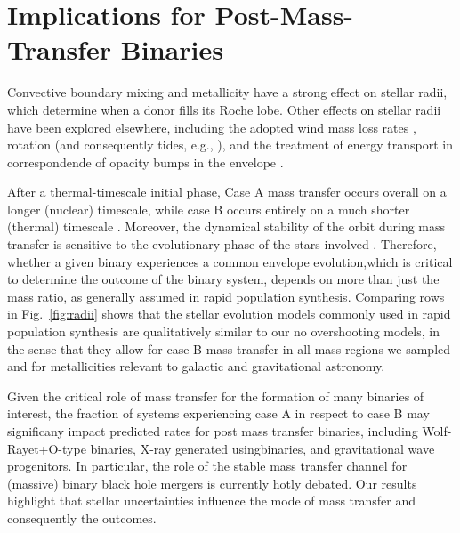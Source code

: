 \documentclass[twocolumn]{aastex63}
\DeclareRobustCommand{\Figref}[1]{Fig.~\ref{#1}}
\begin{document}
\section{Implications for Post-Mass-Transfer Binaries}

Convective boundary mixing \citep{brott:11, johnston:24} and
metallicity have a strong effect on stellar radii, which determine
when a donor fills its Roche lobe. Other effects on stellar radii have
been explored elsewhere, including the adopted wind mass loss rates
\citep[e.g.,][]{smith:14, renzo:17, josiek:24}, rotation (and
consequently tides, e.g., \citealt{maeder:00}), and the treatment of energy transport
in correspondende of opacity bumps in the envelope
\citep[e.g.,][]{joss:73, agrawal:22, cheng:24}.

After a thermal-timescale initial phase, Case A mass transfer occurs
overall on a longer (nuclear) timescale, while case B occurs entirely
on a much shorter (thermal) timescale \citep[but see][]{klencki:22}.
Moreover, the dynamical stability of the orbit during mass transfer is
sensitive to the evolutionary phase of the stars involved
\citep[e.g.,][]{claeys:14}. Therefore, whether a given binary
experiences a common envelope evolution,which is critical to determine
the outcome of the binary system, depends on more than just the mass
ratio, as generally assumed in rapid population synthesis. Comparing
rows in \Figref{fig:radii} shows that the stellar evolution models
commonly used in rapid population synthesis are qualitatively similar
to our no overshooting models, in the sense that they allow for case B
mass transfer in all mass regions we sampled and for metallicities
relevant to galactic and gravitational astronomy.

Given the critical role of mass transfer for the formation of many
binaries of interest, the fraction of systems experiencing case A in
respect to case B may significany impact predicted rates for post mass
transfer binaries, including Wolf-Rayet+O-type binaries, X-ray
generated usingbinaries, and gravitational wave progenitors. In
particular, the role of the stable mass transfer channel
\citep[e.g.,][]{marchant:21, vanson:22} for (massive) binary black
hole mergers is currently hotly debated. Our results highlight that
stellar uncertainties influence the mode of mass transfer and
consequently the outcomes.




\end{document}
